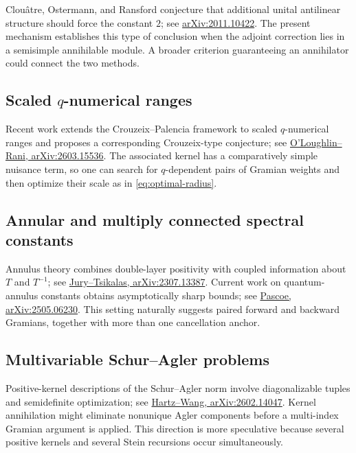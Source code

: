 \documentclass[11pt]{article}
\begin{document}
Clou\^atre, Ostermann, and Ransford conjecture that additional unital
antilinear structure should force the constant $2$; see
\href{https://arxiv.org/abs/2011.10422}{arXiv:2011.10422}.
The present mechanism establishes this type of conclusion when the
adjoint correction lies in a semisimple annihilable module.  A broader
criterion guaranteeing an annihilator could connect the two methods.

\subsection{Scaled \texorpdfstring{$q$}{q}-numerical ranges}

Recent work extends the Crouzeix--Palencia framework to scaled
$q$-numerical ranges and proposes a corresponding Crouzeix-type
conjecture; see
\href{https://arxiv.org/abs/2603.15536}
{O'Loughlin--Rani, arXiv:2603.15536}.
The associated kernel has a comparatively simple nuisance term, so
one can search for $q$-dependent pairs of Gramian weights and then
optimize their scale as in \eqref{eq:optimal-radius}.

\subsection{Annular and multiply connected spectral constants}

Annulus theory combines double-layer positivity with coupled
information about $T$ and $T^{-1}$; see
\href{https://arxiv.org/abs/2307.13387}
{Jury--Tsikalas, arXiv:2307.13387}.
Current work on quantum-annulus constants obtains asymptotically sharp
bounds; see
\href{https://arxiv.org/abs/2505.06230}
{Pascoe, arXiv:2505.06230}.
This setting naturally suggests paired forward and backward Gramians,
together with more than one cancellation anchor.

\subsection{Multivariable Schur--Agler problems}

Positive-kernel descriptions of the Schur--Agler norm involve
diagonalizable tuples and semidefinite optimization; see
\href{https://arxiv.org/abs/2602.14047}
{Hartz--Wang, arXiv:2602.14047}.
Kernel annihilation might eliminate nonunique Agler components before
a multi-index Gramian argument is applied.  This direction is more
speculative because several positive kernels and several Stein
recursions occur simultaneously.
\end{document}
